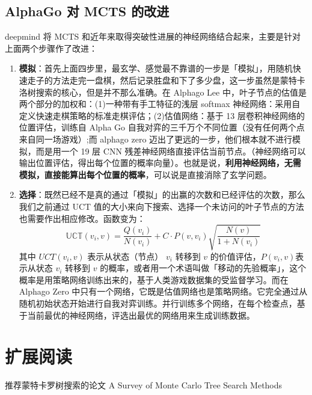 \documentclass[12pt]{article}
\begin{document}
\subsection{AlphaGo 对 MCTS 的改进}
deepmind 将 MCTS 和近年来取得突破性进展的神经网络结合起来，主要是针对上面两个步骤作了改进：
\begin{enumerate}
\setlength{\itemsep}{0pt}
\setlength{\parsep}{0pt}
\setlength{\parskip}{0pt}
    \item \textbf{模拟}：首先上面四步里，最玄学、感觉最不靠谱的一步是「模拟」，用随机快速走子的方法走完一盘棋，然后记录胜盘和下了多少盘，这一步虽然是蒙特卡洛树搜索的核心，但是并不那么准确。在 Alphago Lee 中，叶子节点的估值是两个部分的加权和：(1)一种带有手工特征的浅层 softmax 神经网络：采用自定义快速走棋策略的标准走棋评估；(2)估值网络：基于 13 层卷积神经网络的位置评估，训练自 Alpha Go 自我对弈的三千万个不同位置（没有任何两个点来自同一场游戏）;而 alphago zero 迈出了更远的一步，他们根本就不进行模拟，而是用一个 19 层 CNN 残差神经网络直接评估当前节点。（神经网络可以输出位置评估，得出每个位置的概率向量）。也就是说，\textbf{利用神经网络，无需模拟，直接能算出每个位置的概率}，可以说是直接消除了玄学问题。
    \item \textbf{选择}：既然已经不是真的通过「模拟」的出赢的次数和已经评估的次数，那么我们之前通过 UCT 值的大小来向下搜索、选择一个未访问的叶子节点的方法也需要作出相应修改。函数变为：
$$
\mathbb{UCT}(v_i, v) = \frac{Q(v_i)}{N(v_i)} + C\cdot P(v, v_i)\sqrt{\frac{N(v)}{1+N(v_i)}}
$$
其中 $UCT(v_i, v)$ 表示从状态（节点） $v_i$ 转移到 $v$ 的价值评估，$P(v_i, v)$表示从状态 $v_i$ 转移到 $v$ 的概率，或者用一个术语叫做「移动的先验概率」，这个概率是用策略网络训练出来的，基于人类游戏数据集的受监督学习。而在 Alphago Zero 中只有一个网络，它既是估值网络也是策略网络。它完全通过从随机初始状态开始进行自我对弈训练。并行训练多个网络，在每个检查点，基于当前最优的神经网络，评选出最优的网络用来生成训练数据。
\end{enumerate}

\section{扩展阅读}
推荐蒙特卡罗树搜索的论文 A Survey of Monte Carlo Tree Search Methods




\end{document}
